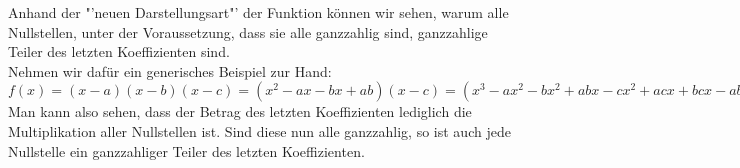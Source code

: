 Anhand der "'neuen Darstellungsart"' der Funktion können wir sehen, warum alle Nullstellen, unter der Voraussetzung, dass sie alle ganzzahlig sind, ganzzahlige Teiler des letzten Koeffizienten sind.\\
Nehmen wir dafür ein generisches Beispiel zur Hand:\\
$f(x)=(x-a)(x-b)(x-c)=(x^2 - ax - bx + ab)(x-c)=(x^3 - ax^2 - bx^2 + abx - cx^2 + acx + bcx - abc)$\\
Man kann also sehen, dass der Betrag des letzten Koeffizienten lediglich die Multiplikation aller Nullstellen ist. Sind diese nun alle ganzzahlig, so ist auch jede Nullstelle ein ganzzahliger Teiler des letzten Koeffizienten.